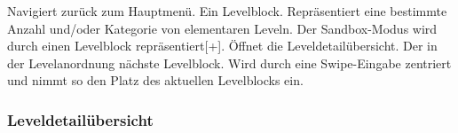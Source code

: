 \begin{center}
\setlength\fboxsep{20pt}
\setlength\fboxrule{1pt}
\end{center}

\begin{requirements}
 Navigiert zurück zum Hauptmenü.
 Ein Levelblock. Repräsentiert eine bestimmte Anzahl und/oder Kategorie von elementaren Leveln. Der Sandbox-Modus wird durch einen Levelblock repräsentiert[+]. Öffnet die Leveldetailübersicht.
 Der in der Levelanordnung nächste Levelblock. Wird durch eine Swipe-Eingabe zentriert und nimmt so den Platz des aktuellen Levelblocks ein.
\end{requirements}

\subsubsection{Leveldetailübersicht}

\begin{center}
\setlength\fboxsep{20pt}
\setlength\fboxrule{1pt}
\end{center}

